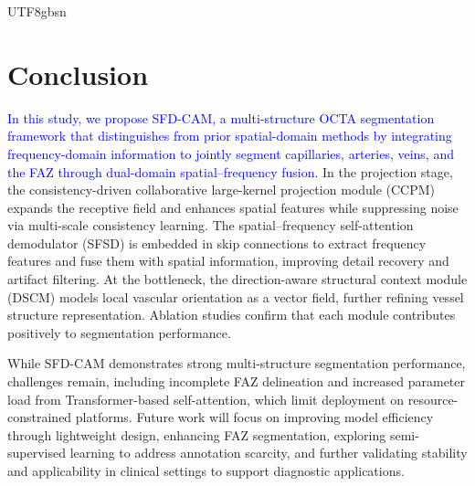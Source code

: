 \documentclass[times, review, 10pt]{elsarticle}
\begin{document}
\begin{CJK}{UTF8}{gbsn}
\section{Conclusion}\label{Conclusion}
\textcolor{blue}{In this study, we propose SFD-CAM, a multi-structure OCTA segmentation framework that distinguishes from prior spatial-domain methods by integrating frequency-domain information to jointly segment capillaries, arteries, veins, and the FAZ through dual-domain spatial–frequency fusion.} In the projection stage, the consistency-driven collaborative large-kernel projection module (CCPM) expands the receptive field and enhances spatial features while suppressing noise via multi-scale consistency learning. The spatial–frequency self-attention demodulator (SFSD) is embedded in skip connections to extract frequency features and fuse them with spatial information, improving detail recovery and artifact filtering. At the bottleneck, the direction-aware structural context module (DSCM) models local vascular orientation as a vector field, further refining vessel structure representation. Ablation studies confirm that each module contributes positively to segmentation performance.
\par
While SFD-CAM demonstrates strong multi-structure segmentation performance, challenges remain, including incomplete FAZ delineation and increased parameter load from Transformer-based self-attention, which limit deployment on resource-constrained platforms. Future work will focus on improving model efficiency through lightweight design, enhancing FAZ segmentation, exploring semi-supervised learning to address annotation scarcity, and further validating stability and applicability in clinical settings to support diagnostic applications.

\end{CJK}
\end{document}

